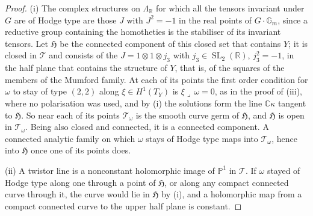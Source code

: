\documentclass[11pt,reqno]{amsart}
\theoremstyle{plain}
\theoremstyle{definition}
\theoremstyle{remark}
\newcommand{\RR}{\mathbb{R}}
\newcommand{\CC}{\mathbb{C}}
\newcommand{\PP}{\mathbb{P}}
\DeclareMathOperator{\SL}{SL}
\begin{document}
\begin{proof}
(i) The complex structures on $\Lambda_{\RR}$ for which all the tensors
invariant under $G$ are of Hodge type are those $J$ with $J^{2}=-1$ in the
real points of $G\cdot\mathbb{G}_{m}$, since a reductive group containing the
homotheties is the stabiliser of its invariant tensors. Let $\mathfrak{H}$ be
the connected component of this closed set that contains $Y$; it is closed in
$\mathcal{T}$ and consists of the $J=1\otimes1\otimes j_{3}$ with
$j_{3}\in\SL_{2}(\RR)$, $j_{3}^{2}=-1$, in the half plane that contains the
structure of $Y$, that is, of the squares of the members of the Mumford
family. At each of its points the first order condition for $\omega$ to stay
of type $(2,2)$ along $\xi\in H^{1}(T_{Y})$ is $\xi\lrcorner\,\omega=0$, as
in the proof of
(iii), where no polarisation was used, and by
(i) the solutions form the line $\CC\kappa$ tangent to
$\mathfrak{H}$. So near each of its points $\mathcal{T}_{\omega}$ is the smooth
curve germ of $\mathfrak{H}$, and $\mathfrak{H}$ is open in
$\mathcal{T}_{\omega}$. Being also closed and connected, it is a connected
component. A connected analytic family on which $\omega$ stays of Hodge type
maps into $\mathcal{T}_{\omega}$, hence into $\mathfrak{H}$ once one of its
points does.

(ii) A twistor line is a nonconstant holomorphic image of $\PP^{1}$ in
$\mathcal{T}$. If $\omega$ stayed of Hodge type along one through a point of
$\mathfrak{H}$, or along any compact connected curve through it, the curve
would lie in $\mathfrak{H}$ by (i), and a holomorphic map from a compact
connected curve to the upper half plane is constant.


\end{proof}
\end{document}
